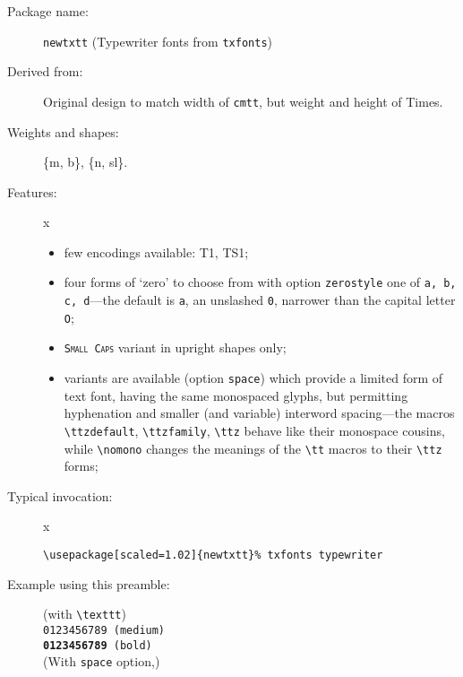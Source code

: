 \documentclass{article}
\begin{document}
\thispagestyle{empty}
\begin{description}
\item[Package name:] {\tt newtxtt} (Typewriter fonts from {\tt txfonts})
\item[Derived from:] Original design to match width of {\tt cmtt}, but weight and height of Times. 
\item[Weights and shapes:]  \{m, b\}, \{n, sl\}. 
\item[Features:]{\color{white}x}\\[-15pt]  
\begin{itemize}
\item few encodings available: T1, TS1;
\item four forms of `zero' to choose from with option {\tt zerostyle} one of {\tt a, b, c, d}---the default is {\tt a}, an unslashed {\tt 0}, narrower than the capital letter {\tt O}; 
\item \texttt{\textsc{Small Caps}} variant in upright shapes only;
\item variants are available (option {\tt space}) which provide a limited form of text font, having the same monospaced glyphs, but permitting hyphenation and smaller (and variable) interword spacing---the macros \verb|\ttzdefault|, \verb|\ttzfamily|, \verb|\ttz| behave like their monospace cousins, while \verb|\nomono| changes the meanings of the \verb|\tt| macros to their \verb|\ttz| forms;
\end{itemize}
\item[Typical invocation:]{\color{white}x}
\begin{verbatim}
\usepackage[scaled=1.02]{newtxtt}% txfonts typewriter
\end{verbatim}
\item[Example using this preamble:] (with \verb|\texttt|)\\[6pt]
\texttt{\lipsum[1]}
\texttt{0123456789 (medium)}\\
\texttt{\textbf{0123456789} (bold)}\\[6pt]
(With \verb|space| option,)\\
{\lipsum[1]}
\end{description}
\end{document}

